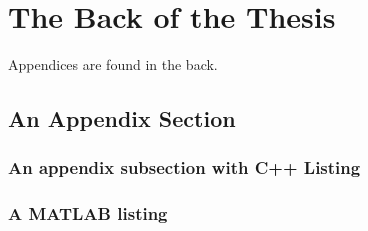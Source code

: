 %
\chapter{The Back of the Thesis}

Appendices are found in the back. 


\section{An Appendix Section}

\subsection{An appendix subsection with C++ Listing}


\subsection{A MATLAB listing}
